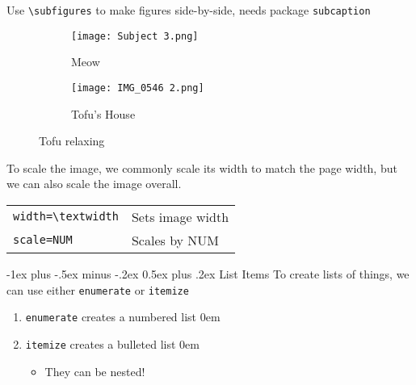 \documentclass{article}
\makeatletter
\renewcommand{\section}{\@startsection{section}{1}{0mm}%
                                {-1ex plus -.5ex minus -.2ex}%
                                {0.5ex plus .2ex}%
                                {\normalfont\large\bfseries}}
\makeatother
\begin{document}
\begin{multicols}{4}
Use \verb|\subfigures| to make figures side-by-side, needs package \verb|subcaption|
\begin{figure}[H]
     \centering
     \begin{subfigure}{0.49\linewidth}
         \centering
         \texttt{[image: Subject 3.png]}
         \caption{Meow}
         \label{imgA}
     \end{subfigure}
     \hfill
     \begin{subfigure}{0.49\linewidth}
         \centering
         \texttt{[image: IMG\_0546 2.png]}
         \caption{Tofu's House}
         \label{imgB}
     \end{subfigure}
        \caption{Tofu relaxing}
        \label{fig:twoImages}
\end{figure}

To scale the image, we commonly scale its width to match the page width, but we can also scale the image overall.
\begin{tabular}{ll}
    \verb|width=\textwidth| & Sets image width\\
    \verb|scale=NUM| & Scales by NUM 
\end{tabular}

\section{List Items} 
To create lists of things, we can use either \verb|enumerate| or \verb|itemize|
\vspace{-8pt}
\begin{enumerate}
    \item \verb|enumerate| creates a numbered list
    \itemsep0em 
    \item \verb|itemize| creates a bulleted list
    \itemsep0em 
    \begin{itemize}
        \item They can be nested!
    \end{itemize}
\end{enumerate}


\end{multicols}
\end{document}
